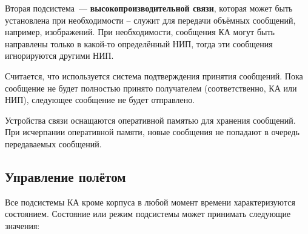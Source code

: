 \documentclass[12pt,a4paper]{article}
\begin{document}
Вторая подсистема~--- \textbf{высокопроизводительной связи}, которая может быть
установлена при необходимости – служит для передачи объёмных сообщений, например,
изображений. При необходимости, сообщения КА могут быть направлены только в какой-то
определённый НИП, тогда эти сообщения игнорируются другими НИП.

Считается, что используется система подтверждения принятия сообщений. Пока сообщение не
будет полностью принято получателем (соответственно, КА или НИП), следующее сообщение не
будет отправлено.

Устройства связи оснащаются оперативной памятью для хранения сообщений. При исчерпании
оперативной памяти, новые сообщения не попадают в очередь передаваемых сообщений.

\subsection{Управление полётом}
\label{Sec:CPU}

Все подсистемы КА кроме корпуса в любой момент времени характеризуются
состоянием. Состояние или режим подсистемы может принимать следующие значения:
\end{document}
